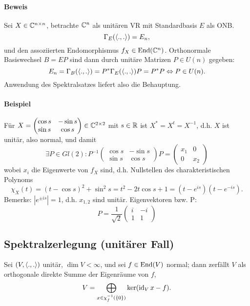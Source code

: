 \paragraph{Beweis}
	Sei $ X\in \mathbb{C}^{n\times n} $, betrachte $ \mathbb{C}^n $ als unitären VR mit Standardbasis $ E $ als ONB.
		\[ \Gamma_E(\langle .,. \rangle) = E_n, \]
	und den assoziierten Endomorphismus $ f_X\in \operatorname{End}(\mathbb{C}^n) $. Orthonormale Basiswechsel $ B=EP $ sind dann durch unitäre Matrizen $ P\in U(n) $ gegeben:
		\[ E_n = \Gamma_B(\langle .,. \rangle) = P^*\Gamma_E(\langle .,. \rangle)P = P^*P \Leftrightarrow P\in U(n). \]
	Anwendung des Spektralsatzes liefert also die Behauptung.

\paragraph{Beispiel}
	Für  $ X = \begin{pmatrix}
	\cos s & -\sin s\\ \sin s & \cos s
	\end{pmatrix}\in \mathbb{C}^{2\times 2} $ mit $ s\in \mathbb{R} $ ist $ X^*=X^t = X^{-1} $, d.h. $ X $ ist unitär, also normal, und damit
		\[ \exists P\in Gl(2): P^{-1}\begin{pmatrix}
		\cos s & -\sin s\\ \sin s & \cos s
		\end{pmatrix}P = \begin{pmatrix}
		x_1 & 0 \\ 0 & x_2
		\end{pmatrix} \]
	wobei $ x_i $ die Eigenwerte von $ f_X $ sind, d.h. Nullstellen des charakteristischen Polynoms
		\[ \chi_X(t) = (t-\cos s)^2 + \sin^2 s = t^2-2t\cos s + 1 = (t-e^{is})(t-e^{-is}). \]
	Bemerke: $ |e^{\pm is}| = 1 $, d.h. $ x_{1,2} $ sind unitär. Eigenvektoren bzw. P:
		\[ P = \frac{1}{\sqrt{2}}\begin{pmatrix} i & -i \\ 1 & 1 \end{pmatrix} \]

\subsection{Spektralzerlegung (unitärer Fall)}
\begin{Lemma}[]
	Sei $ (V,\langle .,. \rangle) $ unitär, $ \dim V <\infty $, und sei $ f\in \operatorname{End}(V) $ normal; dann zerfällt $ V $ als orthogonale direkte Summe der Eigenräume von $ f $,
		\[ V = \bigoplus_{x\in \chi_f^{-1}(\{0\})} \ker(\operatorname{id}_Vx-f). \]
\end{Lemma}
